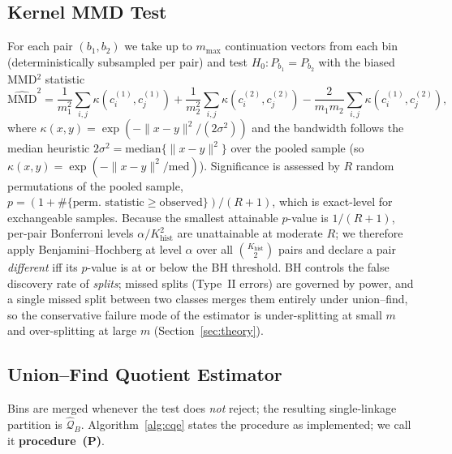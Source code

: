 \documentclass[10pt]{article}
\newcommand{\calQ}{\mathcal{Q}}
\newcommand{\mmd}{\mathrm{MMD}}
\newcommand{\Khist}{K_{\mathrm{hist}}}
\begin{document}
\subsection{Kernel MMD Test}
\label{sec:mmd}

For each pair $(b_1,b_2)$ we take up to $m_{\max}$ continuation vectors from
each bin (deterministically subsampled per pair) and test $H_0:P_{b_1}=P_{b_2}$
with the biased MMD$^2$ statistic
\begin{equation}
\widehat{\mmd}^2
  = \frac{1}{m_1^2}\sum_{i,j}\kappa(c^{(1)}_i,c^{(1)}_j)
  + \frac{1}{m_2^2}\sum_{i,j}\kappa(c^{(2)}_i,c^{(2)}_j)
  - \frac{2}{m_1m_2}\sum_{i,j}\kappa(c^{(1)}_i,c^{(2)}_j),
\label{eq:mmd}
\end{equation}
where $\kappa(x,y)=\exp(-\|x-y\|^2/(2\sigma^2))$ and the bandwidth follows
the median heuristic $2\sigma^2=\mathrm{median}\{\|x-y\|^2\}$ over the pooled
sample (so $\kappa(x,y)=\exp(-\|x-y\|^2/\mathrm{med})$).  Significance is
assessed by $R$ random permutations of the pooled sample,
$p=(1+\#\{\text{perm.\ statistic}\ge\text{observed}\})/(R+1)$, which is
exact-level for exchangeable samples.  Because the smallest attainable
$p$-value is $1/(R{+}1)$, per-pair Bonferroni levels $\alpha/\Khist^2$ are
unattainable at moderate $R$; we therefore apply Benjamini--Hochberg \citep{Benjamini1995} at level
$\alpha$ over all $\binom{\Khist}{2}$ pairs and declare a pair \emph{different}
iff its $p$-value is at or below the BH threshold.  BH controls the false
discovery rate of \emph{splits}; missed splits (Type~II errors) are governed by
power, and a single missed split between two classes merges them entirely
under union--find, so the conservative failure mode of the estimator is
under-splitting at small $m$ and over-splitting at large $m$ (Section~\ref{sec:theory}).

\subsection{Union--Find Quotient Estimator}

Bins are merged whenever the test does \emph{not} reject; the resulting
single-linkage partition is $\widehat{\calQ}_B$.  Algorithm~\ref{alg:cqe} states the
procedure as implemented; we call it \textbf{procedure~(P)}.
\end{document}
